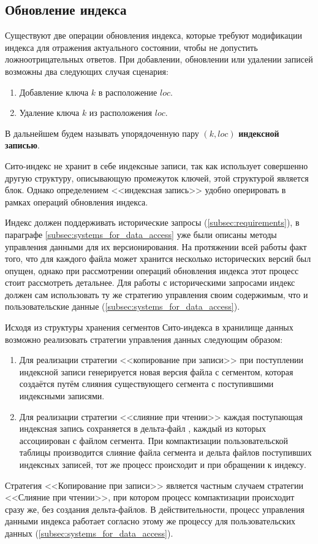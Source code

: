 \subsection{Обновление индекса}

Существуют две операции обновления индекса, которые требуют модификации индекса для отражения актуального состоянии, чтобы не допустить ложноотрицательных ответов. При добавлении, обновлении или удалении записей возможны два следующих случая сценария: 
\begin{enumerate}
    \item Добавление ключа $k$ в расположение $loc$.
    \item Удаление ключа $k$ из расположения $loc$.
\end{enumerate}

В дальнейшем будем называть упорядоченную пару $(k, loc)$ \textbf{индексной записью}.

Сито-индекс не хранит в себе индексные записи, так как использует совершенно другую структуру, описывающую промежуток ключей, этой структурой является блок. Однако определением {<<индексная запись>>} удобно оперировать в рамках операций обновления индекса.

Индекс должен поддерживать исторические запросы (\ref{subsec:requirements}), в параграфе \ref{subsec:systems_for_data_access} уже были описаны методы управления данными для их версионирования. На протяжении всей работы факт того, что для каждого файла может хранится несколько исторических версий был опущен, однако при рассмотрении операций обновления индекса этот процесс стоит рассмотреть детальнее. Для работы с историческими запросами индекс должен сам использовать ту же стратегию управления своим содержимым, что и пользовательские данные (\ref{subsec:systems_for_data_access}).

Исходя из структуры хранения сегментов Сито-индекса в хранилище данных возможно реализовать стратегии управления данных следующим образом:
\begin{enumerate}
    \item Для реализации стратегии {<<копирование при записи>>} при поступлении индексной записи генерируется новая версия файла с сегментом, которая создаётся путём слияния существующего сегмента с поступившими индексными записями.
    \item Для реализации стратегии {<<слияние при чтении>>} каждая поступающая индексная запись сохраняется в дельта-файл , каждый из которых ассоциирован с файлом сегмента. При компактизации пользовательской таблицы производится слияние файла сегмента и дельта файлов поступивших индексных записей, тот же процесс происходит и при обращении к индексу.
\end{enumerate}
Стратегия {<<Копирование при записи>>} является частным случаем стратегии {<<Слияние при чтении>>}, при котором процесс компактизации происходит сразу же, без создания дельта-файлов. В действительности, процесс управления данными индекса работает согласно этому же процессу для пользовательских данных (\ref{subsec:systems_for_data_access}).

